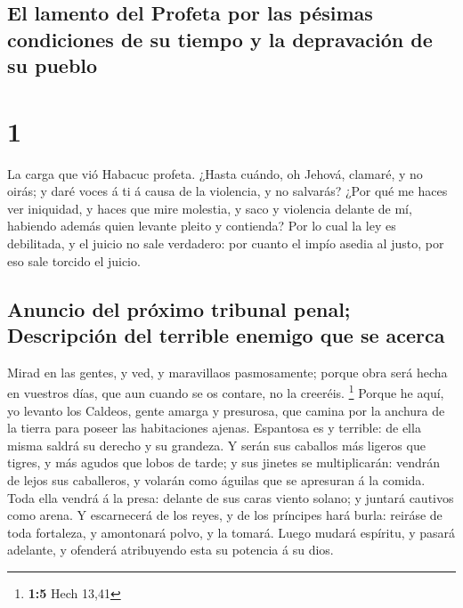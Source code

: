 \hypertarget{el-lamento-del-profeta-por-las-puxe9simas-condiciones-de-su-tiempo-y-la-depravaciuxf3n-de-su-pueblo}{%
\subsection{El lamento del Profeta por las pésimas condiciones de su
tiempo y la depravación de su
pueblo}\label{el-lamento-del-profeta-por-las-puxe9simas-condiciones-de-su-tiempo-y-la-depravaciuxf3n-de-su-pueblo}}

\hypertarget{section}{%
\section{1}\label{section}}

 La carga que vió Habacuc profeta.  ¿Hasta
cuándo, oh Jehová, clamaré, y no oirás; y daré voces á ti á causa de la
violencia, y no salvarás?  ¿Por qué me haces ver iniquidad,
y haces que mire molestia, y saco y violencia delante de mí, habiendo
además quien levante pleito y contienda?  Por lo cual la ley
es debilitada, y el juicio no sale verdadero: por cuanto el impío asedia
al justo, por eso sale torcido el juicio.

\hypertarget{anuncio-del-pruxf3ximo-tribunal-penal-descripciuxf3n-del-terrible-enemigo-que-se-acerca}{%
\subsection{Anuncio del próximo tribunal penal; Descripción del terrible
enemigo que se
acerca}\label{anuncio-del-pruxf3ximo-tribunal-penal-descripciuxf3n-del-terrible-enemigo-que-se-acerca}}

 Mirad en las gentes, y ved, y maravillaos pasmosamente;
porque obra será hecha en vuestros días, que aun cuando se os contare,
no la creeréis. \footnote{\textbf{1:5} Hech 13,41}  Porque
he aquí, yo levanto los Caldeos, gente amarga y presurosa, que camina
por la anchura de la tierra para poseer las habitaciones ajenas.
 Espantosa es y terrible: de ella misma saldrá su derecho y
su grandeza.  Y serán sus caballos más ligeros que tigres, y
más agudos que lobos de tarde; y sus jinetes se multiplicarán: vendrán
de lejos sus caballeros, y volarán como águilas que se apresuran á la
comida.  Toda ella vendrá á la presa: delante de sus caras
viento solano; y juntará cautivos como arena.  Y
escarnecerá de los reyes, y de los príncipes hará burla: reiráse de toda
fortaleza, y amontonará polvo, y la tomará.  Luego mudará
espíritu, y pasará adelante, y ofenderá atribuyendo esta su potencia á
su dios.

